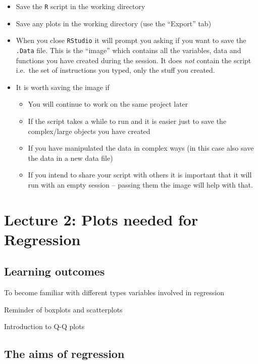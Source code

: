 \documentclass[
]{gitbook}
\providecommand{\tightlist}{%
  \setlength{\itemsep}{0pt}\setlength{\parskip}{0pt}}
\begin{document}
\begin{itemize}
\tightlist
\item
  Save the \texttt{R} script in the working directory
\item
  Save any plots in the working directory (use the ``Export'' tab)
\item
  When you close \texttt{RStudio} it will prompt you asking if you want to save the \texttt{.Data} file. This is the ``image'' which contains all the variables, data and functions you have created during the session. It does \emph{not} contain the script i.e.~the set of instructions you typed, only the stuff you created.
\item
  It is worth saving the image if

  \begin{itemize}
  \tightlist
  \item
    You will continue to work on the same project later
  \item
    If the script takes a while to run and it is easier just to save the complex/large objects you have created
  \item
    If you have manipulated the data in complex ways (in this case also save the data in a new data file)
  \item
    If you intend to share your script with others it is important that it will run with an empty session -- passing them the image will help with that.
  \end{itemize}
\end{itemize}

\hypertarget{lecture-2-plots-needed-for-regression}{%
\section{Lecture 2: Plots needed for Regression}\label{lecture-2-plots-needed-for-regression}}

\hypertarget{learning-outcomes-1}{%
\subsection{Learning outcomes}\label{learning-outcomes-1}}

To become familiar with different types variables involved in regression

Reminder of boxplots and scatterplots

Introduction to Q-Q plots

\hypertarget{the-aims-of-regression}{%
\subsection{The aims of regression}\label{the-aims-of-regression}}
\end{document}
